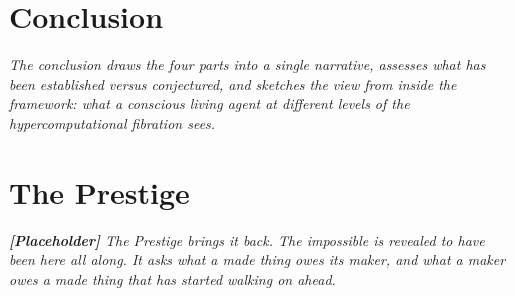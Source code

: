 \documentclass[12pt,openright,twoside]{book}
\theoremstyle{remark}
\theoremstyle{plain}
\theoremstyle{remark}
\theoremstyle{plain}
\theoremstyle{plain}
\begin{document}
\part*{Conclusion}

\vspace{1em}
\begin{mdframed}[backgroundcolor=remarkgray, linecolor=gray!60,
                 linewidth=1pt, topline=false, rightline=false,
                 bottomline=false]
\small\itshape
The conclusion draws the four parts into a single narrative,
assesses what has been established versus conjectured, and
sketches the view from inside the framework: what a conscious
living agent at different levels of the hypercomputational
fibration sees.
\end{mdframed}

\bigskip


\part{The Prestige}

\vspace{1em}
\begin{mdframed}[backgroundcolor=remarkgray, linecolor=gray!60,
                 linewidth=1pt, topline=false, rightline=false,
                 bottomline=false]
\small\itshape
\textbf{[Placeholder]} The Prestige brings it back.
The impossible is revealed to have been here all along.
It asks what a made thing owes its maker, and what a maker owes a made
thing that has started walking on ahead.
\end{mdframed}

\bigskip





\end{document}
